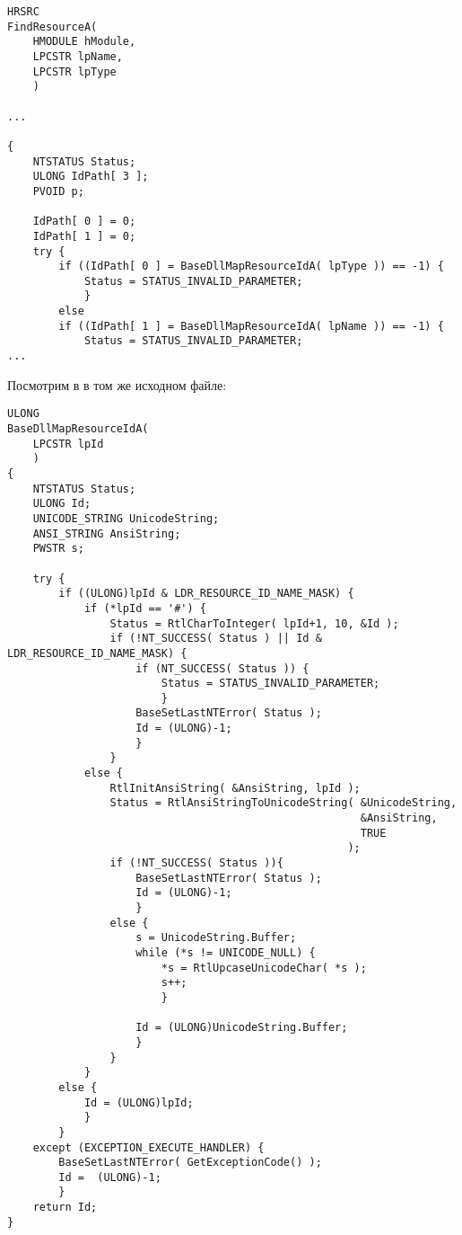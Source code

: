 \begin{lstlisting}[style=customc]
HRSRC
FindResourceA(
    HMODULE hModule,
    LPCSTR lpName,
    LPCSTR lpType
    )

...

{
    NTSTATUS Status;
    ULONG IdPath[ 3 ];
    PVOID p;

    IdPath[ 0 ] = 0;
    IdPath[ 1 ] = 0;
    try {
        if ((IdPath[ 0 ] = BaseDllMapResourceIdA( lpType )) == -1) {
            Status = STATUS_INVALID_PARAMETER;
            }
        else
        if ((IdPath[ 1 ] = BaseDllMapResourceIdA( lpName )) == -1) {
            Status = STATUS_INVALID_PARAMETER;
...
\end{lstlisting}

Посмотрим в  в том же исходном файле:

\begin{lstlisting}[style=customc]
ULONG
BaseDllMapResourceIdA(
    LPCSTR lpId
    )
{
    NTSTATUS Status;
    ULONG Id;
    UNICODE_STRING UnicodeString;
    ANSI_STRING AnsiString;
    PWSTR s;

    try {
        if ((ULONG)lpId & LDR_RESOURCE_ID_NAME_MASK) {
            if (*lpId == '#') {
                Status = RtlCharToInteger( lpId+1, 10, &Id );
                if (!NT_SUCCESS( Status ) || Id & LDR_RESOURCE_ID_NAME_MASK) {
                    if (NT_SUCCESS( Status )) {
                        Status = STATUS_INVALID_PARAMETER;
                        }
                    BaseSetLastNTError( Status );
                    Id = (ULONG)-1;
                    }
                }
            else {
                RtlInitAnsiString( &AnsiString, lpId );
                Status = RtlAnsiStringToUnicodeString( &UnicodeString,
                                                       &AnsiString,
                                                       TRUE
                                                     );
                if (!NT_SUCCESS( Status )){
                    BaseSetLastNTError( Status );
                    Id = (ULONG)-1;
                    }
                else {
                    s = UnicodeString.Buffer;
                    while (*s != UNICODE_NULL) {
                        *s = RtlUpcaseUnicodeChar( *s );
                        s++;
                        }

                    Id = (ULONG)UnicodeString.Buffer;
                    }
                }
            }
        else {
            Id = (ULONG)lpId;
            }
        }
    except (EXCEPTION_EXECUTE_HANDLER) {
        BaseSetLastNTError( GetExceptionCode() );
        Id =  (ULONG)-1;
        }
    return Id;
}
\end{lstlisting}

